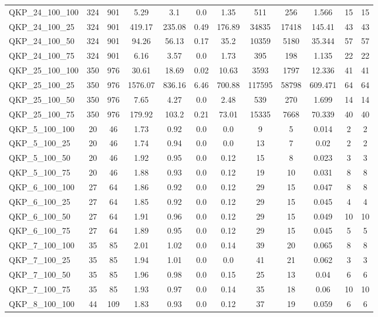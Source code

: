 \begin{table}[!h]
{\begin{tabular}{lccccccccccc}
QKP\_24\_100\_100 & 324 & 901 & 5.29 & 3.1 & 0.0 & 1.35 & 511 & 256 & 1.566 & 15 & 15\\
QKP\_24\_100\_25 & 324 & 901 & 419.17 & 235.08 & 0.49 & 176.89 & 34835 & 17418 & 145.41 & 43 & 43\\
QKP\_24\_100\_50 & 324 & 901 & 94.26 & 56.13 & 0.17 & 35.2 & 10359 & 5180 & 35.344 & 57 & 57\\
QKP\_24\_100\_75 & 324 & 901 & 6.16 & 3.57 & 0.0 & 1.73 & 395 & 198 & 1.135 & 22 & 22\\
QKP\_25\_100\_100 & 350 & 976 & 30.61 & 18.69 & 0.02 & 10.63 & 3593 & 1797 & 12.336 & 41 & 41\\
QKP\_25\_100\_25 & 350 & 976 & 1576.07 & 836.16 & 6.46 & 700.88 & 117595 & 58798 & 609.471 & 64 & 64\\
QKP\_25\_100\_50 & 350 & 976 & 7.65 & 4.27 & 0.0 & 2.48 & 539 & 270 & 1.699 & 14 & 14\\
QKP\_25\_100\_75 & 350 & 976 & 179.92 & 103.2 & 0.21 & 73.01 & 15335 & 7668 & 70.339 & 40 & 40\\
QKP\_5\_100\_100 & 20 & 46 & 1.73 & 0.92 & 0.0 & 0.0 & 9 & 5 & 0.014 & 2 & 2\\
QKP\_5\_100\_25 & 20 & 46 & 1.74 & 0.94 & 0.0 & 0.0 & 13 & 7 & 0.02 & 2 & 2\\
QKP\_5\_100\_50 & 20 & 46 & 1.92 & 0.95 & 0.0 & 0.12 & 15 & 8 & 0.023 & 3 & 3\\
QKP\_5\_100\_75 & 20 & 46 & 1.88 & 0.93 & 0.0 & 0.12 & 19 & 10 & 0.031 & 8 & 8\\
QKP\_6\_100\_100 & 27 & 64 & 1.86 & 0.92 & 0.0 & 0.12 & 29 & 15 & 0.047 & 8 & 8\\
QKP\_6\_100\_25 & 27 & 64 & 1.85 & 0.92 & 0.0 & 0.12 & 29 & 15 & 0.045 & 4 & 4\\
QKP\_6\_100\_50 & 27 & 64 & 1.91 & 0.96 & 0.0 & 0.12 & 29 & 15 & 0.049 & 10 & 10\\
QKP\_6\_100\_75 & 27 & 64 & 1.89 & 0.95 & 0.0 & 0.12 & 29 & 15 & 0.045 & 5 & 5\\
QKP\_7\_100\_100 & 35 & 85 & 2.01 & 1.02 & 0.0 & 0.14 & 39 & 20 & 0.065 & 8 & 8\\
QKP\_7\_100\_25 & 35 & 85 & 1.94 & 1.01 & 0.0 & 0.0 & 41 & 21 & 0.062 & 3 & 3\\
QKP\_7\_100\_50 & 35 & 85 & 1.96 & 0.98 & 0.0 & 0.15 & 25 & 13 & 0.04 & 6 & 6\\
QKP\_7\_100\_75 & 35 & 85 & 1.93 & 0.97 & 0.0 & 0.14 & 35 & 18 & 0.06 & 10 & 10\\
QKP\_8\_100\_100 & 44 & 109 & 1.83 & 0.93 & 0.0 & 0.12 & 37 & 19 & 0.059 & 6 & 6\\

\end{tabular}}
\end{table}
